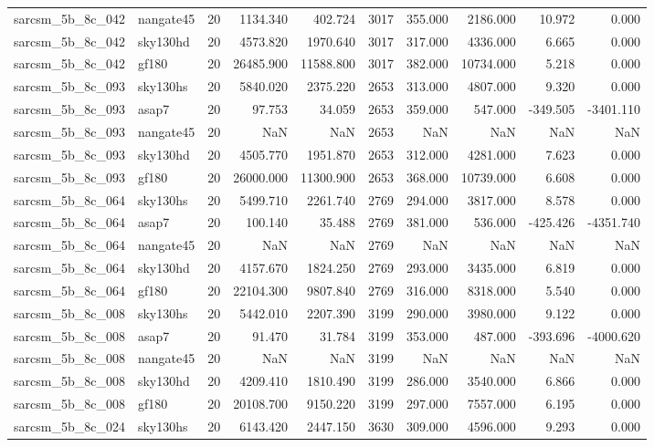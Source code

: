 \begin{tabular}{llrrrrrrrr}
sarcsm\_5b\_8c\_042 & nangate45 & 20 & 1134.340 & 402.724 & 3017 & 355.000 & 2186.000 & 10.972 & 0.000 \\
sarcsm\_5b\_8c\_042 & sky130hd & 20 & 4573.820 & 1970.640 & 3017 & 317.000 & 4336.000 & 6.665 & 0.000 \\
sarcsm\_5b\_8c\_042 & gf180 & 20 & 26485.900 & 11588.800 & 3017 & 382.000 & 10734.000 & 5.218 & 0.000 \\
sarcsm\_5b\_8c\_093 & sky130hs & 20 & 5840.020 & 2375.220 & 2653 & 313.000 & 4807.000 & 9.320 & 0.000 \\
sarcsm\_5b\_8c\_093 & asap7 & 20 & 97.753 & 34.059 & 2653 & 359.000 & 547.000 & -349.505 & -3401.110 \\
sarcsm\_5b\_8c\_093 & nangate45 & 20 & NaN & NaN & 2653 & NaN & NaN & NaN & NaN \\
sarcsm\_5b\_8c\_093 & sky130hd & 20 & 4505.770 & 1951.870 & 2653 & 312.000 & 4281.000 & 7.623 & 0.000 \\
sarcsm\_5b\_8c\_093 & gf180 & 20 & 26000.000 & 11300.900 & 2653 & 368.000 & 10739.000 & 6.608 & 0.000 \\
sarcsm\_5b\_8c\_064 & sky130hs & 20 & 5499.710 & 2261.740 & 2769 & 294.000 & 3817.000 & 8.578 & 0.000 \\
sarcsm\_5b\_8c\_064 & asap7 & 20 & 100.140 & 35.488 & 2769 & 381.000 & 536.000 & -425.426 & -4351.740 \\
sarcsm\_5b\_8c\_064 & nangate45 & 20 & NaN & NaN & 2769 & NaN & NaN & NaN & NaN \\
sarcsm\_5b\_8c\_064 & sky130hd & 20 & 4157.670 & 1824.250 & 2769 & 293.000 & 3435.000 & 6.819 & 0.000 \\
sarcsm\_5b\_8c\_064 & gf180 & 20 & 22104.300 & 9807.840 & 2769 & 316.000 & 8318.000 & 5.540 & 0.000 \\
sarcsm\_5b\_8c\_008 & sky130hs & 20 & 5442.010 & 2207.390 & 3199 & 290.000 & 3980.000 & 9.122 & 0.000 \\
sarcsm\_5b\_8c\_008 & asap7 & 20 & 91.470 & 31.784 & 3199 & 353.000 & 487.000 & -393.696 & -4000.620 \\
sarcsm\_5b\_8c\_008 & nangate45 & 20 & NaN & NaN & 3199 & NaN & NaN & NaN & NaN \\
sarcsm\_5b\_8c\_008 & sky130hd & 20 & 4209.410 & 1810.490 & 3199 & 286.000 & 3540.000 & 6.866 & 0.000 \\
sarcsm\_5b\_8c\_008 & gf180 & 20 & 20108.700 & 9150.220 & 3199 & 297.000 & 7557.000 & 6.195 & 0.000 \\
sarcsm\_5b\_8c\_024 & sky130hs & 20 & 6143.420 & 2447.150 & 3630 & 309.000 & 4596.000 & 9.293 & 0.000 \\

\end{tabular}
